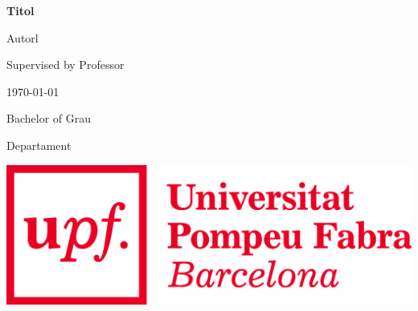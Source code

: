 \def\title{Titol}
\def\autor{Autorl}
\def\supervisor{Professor}
\def\bachelor{Grau}
\def\department{Departament}



\begin{titlepage}

\begin{center}

\vspace{1.5cm}

{\LARGE\bfseries \title }

\vspace{1.5cm}

{\Large \autor }

\vspace{.5cm}

{\Large Supervised by \supervisor }

\vspace{2.5cm}

{\large \today}

\vspace{2.5cm}

{\Large Bachelor of \bachelor }

\vspace{0.5cm}

{\Large \department}

\vspace{6cm}

\includegraphics[scale=0.4]{upf_word_imp.jpg} %

\end{center}

\end{titlepage}


